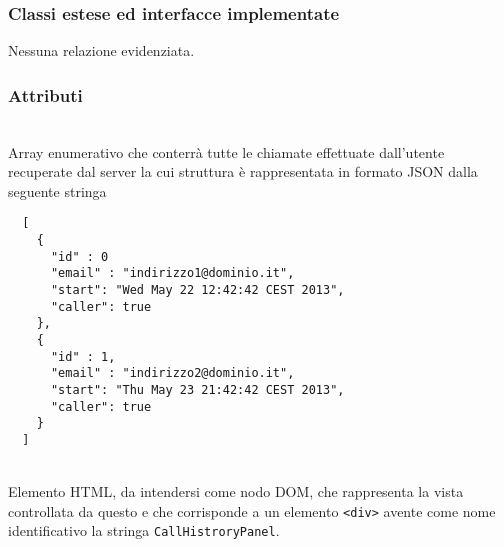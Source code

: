 \subsubsection*{Classi estese ed interfacce implementate}
Nessuna relazione evidenziata.

\subsubsection*{Attributi}
\begin{description}
  \item{}\\
  Array enumerativo che conterrà tutte le chiamate effettuate dall'utente recuperate dal server la cui struttura è rappresentata in formato JSON dalla seguente stringa
  \begin{verbatim}
  [
    {
      "id" : 0
      "email" : "indirizzo1@dominio.it",
      "start": "Wed May 22 12:42:42 CEST 2013",
      "caller": true
    },
    {
      "id" : 1,
      "email" : "indirizzo2@dominio.it",
      "start": "Thu May 23 21:42:42 CEST 2013",
      "caller": true
    }
  ]
  \end{verbatim}
  
  
  \item{}\\
  Elemento HTML, da intendersi come nodo DOM, che rappresenta la vista controllata da questo  e che corrisponde a un elemento \verb'<div>' avente come nome identificativo la stringa \verb'CallHistroryPanel'.
\end{description}

